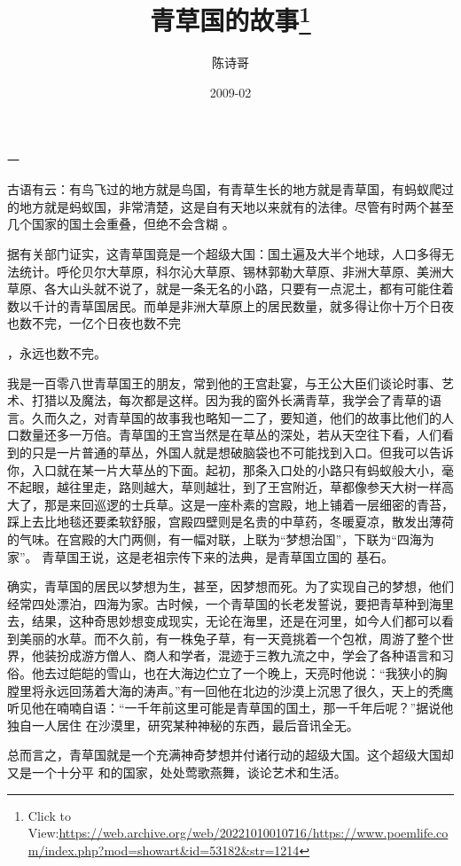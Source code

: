 \documentclass{article}
\title{青草国的故事\footnote{Click to View:\url{https://web.archive.org/web/20221010010716/https://www.poemlife.com/index.php?mod=showart&id=53182&str=1214}}}
\author{陈诗哥}
\date{2009-02}
\begin{document}

\maketitle


\Large


﻿一 

古语有云：有鸟飞过的地方就是鸟国，有青草生长的地方就是青草国，有蚂蚁爬过的地方就是蚂蚁国，非常清楚，这是自有天地以来就有的法律。尽管有时两个甚至几个国家的国土会重叠，但绝不会含糊
。 

据有关部门证实，这青草国竟是一个超级大国：国土遍及大半个地球，人口多得无法统计。呼伦贝尔大草原，科尔沁大草原、锡林郭勒大草原、非洲大草原、美洲大草原、各大山头就不说了，就是一条无名的小路，只要有一点泥土，都有可能住着数以千计的青草国居民。而单是非洲大草原上的居民数量，就多得让你十万个日夜也数不完，一亿个日夜也数不完
\newpage

，永远也数不完。 

我是一百零八世青草国王的朋友，常到他的王宫赴宴，与王公大臣们谈论时事、艺术、打猎以及魔法，每次都是这样。因为我的窗外长满青草，我学会了青草的语言。久而久之，对青草国的故事我也略知一二了，要知道，他们的故事比他们的人口数量还多一万倍。青草国的王宫当然是在草丛的深处，若从天空往下看，人们看到的只是一片普通的草丛，外国人就是想破脑袋也不可能找到入口。但我可以告诉你，入口就在某一片大草丛的下面。起初，那条入口处的小路只有蚂蚁般大小，毫不起眼，越往里走，路则越大，草则越壮，到了王宫附近，草都像参天大树一样高大了，那是来回巡逻的士兵草。这是一座朴素的宫殿，地上铺着一层细密的青苔，踩上去比地毯还要柔软舒服，宫殿四壁则是名贵的中草药，冬暖夏凉，散发出薄荷的气味。在宫殿的大门两侧，有一幅对联，上联为“梦想治国”，下联为“四海为家”。 青草国王说，这是老祖宗传下来的法典，是青草国立国的
基石。 

\newpage

确实，青草国的居民以梦想为生，甚至，因梦想而死。为了实现自己的梦想，他们经常四处漂泊，四海为家。古时候，一个青草国的长老发誓说，要把青草种到海里去，结果，这种奇思妙想变成现实，无论在海里，还是在河里，如今人们都可以看到美丽的水草。而不久前，有一株兔子草，有一天竟挑着一个包袱，周游了整个世界，他装扮成游方僧人、商人和学者，混迹于三教九流之中，学会了各种语言和习俗。他去过皑皑的雪山，也在大海边伫立了一个晚上，天亮时他说：“我狭小的胸膛里将永远回荡着大海的涛声。”有一回他在北边的沙漠上沉思了很久，天上的秃鹰听见他在喃喃自语：“一千年前这里可能是青草国的国土，那一千年后呢？”据说他独自一人居住
在沙漠里，研究某种神秘的东西，最后音讯全无。 

总而言之，青草国就是一个充满神奇梦想并付诸行动的超级大国。这个超级大国却又是一个十分平
和的国家，处处莺歌燕舞，谈论艺术和生活。 
\end{document}
